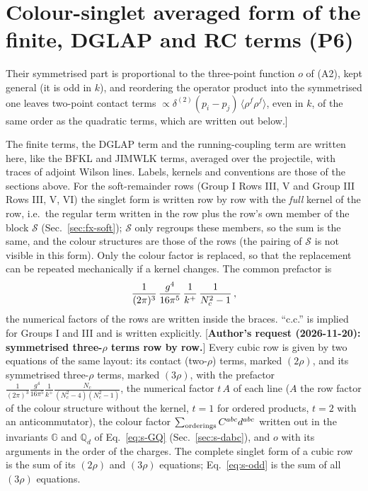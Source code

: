 \documentclass[9pt]{article}
\def\mf#1{\mathbb{#1}}
\numberwithin{equation}{section}
\begin{document}
{\color{red}
\section{Colour-singlet averaged form of the finite, DGLAP and RC terms (P6)}\label{sec:singlet}
\noindent[\textbf{New section; fix P6} (\texttt{fix\_singlet.tex}, taken over with the kernel definitions adapted to this file). \textbf{Correction of a statement of the brief and of the reviews:} the cubic (three-$\rho$) terms do \emph{not} vanish after the average over a colour-singlet projectile. [\textbf{Reworded, author's request (2026-11-20): no model is used}; previously: ``over a Gaussian (or any colour-singlet) projectile; only their symmetrised part does''.] Their symmetrised part is proportional to the three-point function $o$ of (A2), kept general (it is odd in $k$), and reordering the operator product into the symmetrised one leaves two-point contact terms $\propto\delta^{(2)}(p_{i}-p_{j})\,\langle\rho^{f}\rho^{f}\rangle$, even in $k$, of the same order as the quadratic terms, which are written out below.]\par
\noindent The finite terms, the DGLAP term and the running-coupling term are written here, like the BFKL and JIMWLK terms, averaged over the projectile, with traces of adjoint Wilson lines. Labels, kernels and conventions are those of the sections above. For the soft-remainder rows (Group I Rows III, V and Group III Rows III, V, VI) the singlet form is written row by row with the \emph{full} kernel of the row, i.e.\ the regular term written in the row plus the row's own member of the block $\mathcal{S}$ (Sec.~\ref{sec:fx-soft}); $\mathcal{S}$ only regroups these members, so the sum is the same, and the colour structures are those of the rows (the pairing of $\mathcal{S}$ is not visible in this form). Only the colour factor is replaced, so that the replacement can be repeated mechanically if a kernel changes. The common prefactor is
\begin{align}
\frac{1}{(2\pi)^{3}}\,\frac{g^{4}}{16\pi^{5}}\,\frac{1}{k^{+}}\,\frac{1}{N_{c}^{2}-1}\,,\notag
\end{align}
the numerical factors of the rows are written inside the braces. ``c.c.'' is implied for Groups I and III and is written explicitly. [\textbf{Author's request (2026-11-20): symmetrised three-$\rho$ terms row by row.}] Every cubic row is given by two equations of the same layout: its contact (two-$\rho$) terms, marked $(2\rho)$, and its symmetrised three-$\rho$ terms, marked $(3\rho)$, with the prefactor $\frac{1}{(2\pi)^{3}}\frac{g^{4}}{16\pi^{5}}\frac{1}{k^{+}}\frac{N_{c}}{(N_{c}^{2}-4)(N_{c}^{2}-1)}$, the numerical factor $t\,A$ of each line ($A$ the row factor of the colour structure without the kernel, $t=1$ for ordered products, $t=2$ with an anticommutator), the colour factor $\sum_{\rm orderings}C^{abc}d^{abc}$ written out in the invariants $\mf{G}$ and $\mf{Q}_{d}$ of Eq.~\eqref{eq:s-GQ} (Sec.~\ref{sec:s-dabc}), and $o$ with its arguments in the order of the charges. The complete singlet form of a cubic row is the sum of its $(2\rho)$ and $(3\rho)$ equations; Eq.~\eqref{eq:s-odd} is the sum of all $(3\rho)$ equations.

}
\end{document}
